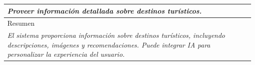 \begin{table}[H]
\begin{tabular}{|llllllll|}
    \multicolumn{8}{|p{15cm}|}{{\color[HTML]{808080} \textit{Proveer información detallada sobre destinos turísticos.}}}                                                                                                                            \\ \hline
    \multicolumn{8}{|l|}{\cellcolor[HTML]{F2F2F2}Resumen}                                                                                                                                                                                     \\ \hline
    \multicolumn{8}{|p{15cm}|}{{\color[HTML]{999999} \textit{El sistema proporciona información sobre destinos turísticos, incluyendo descripciones, imágenes y recomendaciones. Puede integrar IA para personalizar la experiencia del usuario.}}} \\ \hline
    \end{tabular}
    \end{table}

